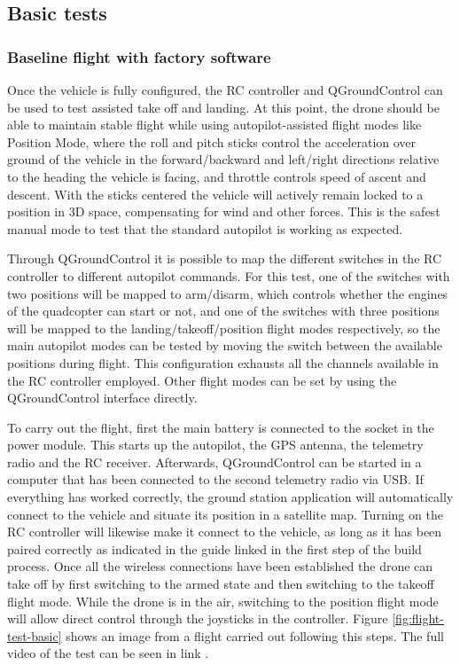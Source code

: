 \subsection{Basic tests}
\label{sec:test-8-flight}


\subsubsection{Baseline flight with factory software}

Once the vehicle is fully configured, the RC controller and QGroundControl can be used to test assisted take off and landing.
At this point, the drone should be able to maintain stable flight while using autopilot-assisted flight modes like Position Mode, where the roll and pitch sticks control the acceleration over ground of the vehicle in the forward/backward and left/right directions relative to the heading the vehicle is facing, and throttle controls speed of ascent and descent. 
With the sticks centered the vehicle will actively remain locked to a position in 3D space, compensating for wind and other forces.
This is the safest manual mode to test that the standard autopilot is working as expected.

Through QGroundControl it is possible to map the different switches in the RC controller to different autopilot commands.
For this test, one of the switches with two positions will be mapped to arm/disarm, which controls whether the engines of the quadcopter can start or not, and one of the switches with three positions will be mapped to the landing/takeoff/position flight modes respectively, so the main autopilot modes can be tested by moving the switch between the available positions during flight.
This configuration exhausts all the channels available in the RC controller employed.
Other flight modes can be set by using the QGroundControl interface directly.

To carry out the flight, first the main battery is connected to the socket in the power module.
This starts up the autopilot, the GPS antenna, the telemetry radio and the RC receiver.
Afterwards, QGroundControl can be started in a computer that has been connected to the second telemetry radio via USB.
If everything has worked correctly, the ground station application will automatically connect to the vehicle and situate its position in a satellite map.
Turning on the RC controller will likewise make it connect to the vehicle, as long as it has been paired correctly as indicated in the guide linked in the first step of the build process.
Once all the wireless connections have been established the drone can take off by first switching to the armed state and then switching to the takeoff flight mode.
While the drone is in the air, switching to the position flight mode will allow direct control through the joysticks in the controller.
Figure \ref{fig:flight-test-basic} shows an image from a flight carried out following this steps.
The full video of the test can be seen in link .

